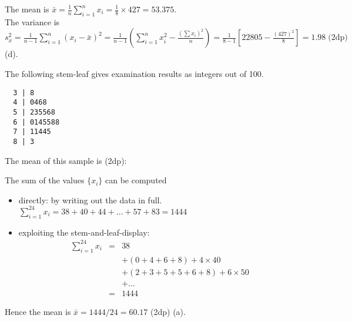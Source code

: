 \documentclass[bigtut]{tutorial}
\begin{document}
\begin{tutorial}
\begin{questions}
\begin{solution}
The mean is $\bar{x}=  \frac{1}{n}\sum_{i=1}^n x_i = \frac{1}{8}\times 427 = 53.375$. \\

The variance is $s^2_x = \frac{1}{n-1}\sum_{i=1}^n(x_i-\bar x)^2 = \frac{1}{n-1} (  \sum_{i=1}^{n} x_i^{2}  - \frac{(\sum x_i)^2}{n} ) =  \frac{1}{8-1}\left[ 22805 - \frac{(427)^2}{8} \right] = 1.98 \;\text{(2dp)}$ (d).

\end{solution}



 \question
 The following stem-leaf gives examination results as integers out of 100.
\begin{verbatim}
  3 | 8
  4 | 0468
  5 | 235568
  6 | 0145588
  7 | 11445
  8 | 3
 \end{verbatim}

The mean of this sample is (2dp):
\begin{solution}
The sum of the values $\{ x_{i} \}$ can be computed
\begin{itemize}
\item directly: by writing out the data in full. $\sum_{i=1}^{24}  x_{i}= 38+40+44+\ldots+57+83 = 1444$
\item exploiting the stem-and-leaf-display:
\begin{eqnarray*}
\sum_{i=1}^{24}  x_{i} &=& 38 \\
& & + (0+4+6+8) + 4 \times 40 \\
& & + (2+3+5+5+6+8) + 6 \times 50 \\
& & + \ldots\\
&=& 1444
\end{eqnarray*}
\end{itemize}
Hence the mean is $\bar{x} = 1444/24 = 60.17$ (2dp) (a).


\end{solution}
\end{questions}
\end{tutorial}
\end{document}
